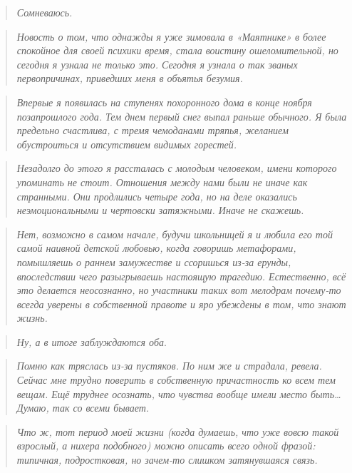 \documentclass[
  a5paperpaper,
  DIV=11,
  numbers=noendperiod]{scrreprt}
\begin{document}
\begin{quote}
\emph{Сомневаюсь.}
\end{quote}

\begin{quote}
\emph{Новость о том, что однажды я уже зимовала в «Маятнике» в более
спокойное для своей психики время, стала воистину ошеломительной, но
сегодня я узнала не только это. Сегодня я узнала о так званых
первопричинах, приведших меня в объятья безумия.}
\end{quote}

\begin{quote}
\emph{Впервые я появилась на ступенях похоронного дома в конце ноября
позапрошлого года. Тем днем первый снег выпал раньше обычного. Я была
предельно счастлива, с тремя чемоданами тряпья, желанием обустроиться и
отсутствием видимых горестей.}
\end{quote}

\begin{quote}
\emph{Незадолго до этого я рассталась с молодым человеком, имени
которого упоминать не стоит. Отношения между нами были не иначе как
странными. Они продлились четыре года, но на деле оказались
неэмоциональными и чертовски затяжными. Иначе не скажешь.}
\end{quote}

\begin{quote}
\emph{Нет, возможно в самом начале, будучи школьницей я и любила его той
самой наивной детской любовью, когда говоришь метафорами, помышляешь о
раннем замужестве и ссоришься из-за ерунды, впоследствии чего
разыгрываешь настоящую трагедию. Естественно, всё это делается
неосознанно, но участники таких вот мелодрам почему-то всегда уверены в
собственной правоте и яро убеждены в том, что знают жизнь.}
\end{quote}

\begin{quote}
\emph{Ну, а в итоге заблуждаются оба}.
\end{quote}

\begin{quote}
\emph{Помню как тряслась из-за пустяков. По ним же и страдала, ревела.
Сейчас мне трудно поверить в собственную причастность ко всем тем вещам.
Ещё труднее осознать, что чувства вообще имели место быть\ldots{} Думаю,
так со всеми бывает.}
\end{quote}

\begin{quote}
\emph{Что ж, тот период моей жизни (когда думаешь, что уже вовсю такой
взрослый, а нихера подобного) можно описать всего одной фразой:
типичная, подростковая, но зачем-то слишком затянувшаяся связь.}
\end{quote}
\end{document}
